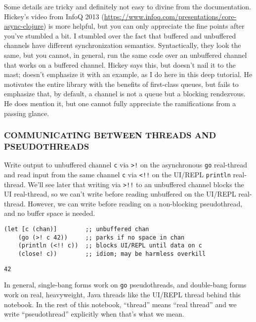 \documentclass[10pt,oneside,x11names]{article}
\begin{document}
Some details are tricky and definitely not easy to divine from the
documentation. Hickey's video from InfoQ 2013
(\url{https://www.infoq.com/presentations/core-async-clojure}) is more
helpful, but you can only appreciate the fine points after you've
stumbled a bit. I stumbled over the fact that buffered and unbuffered
channels have different synchronization semantics. Syntactically, they
look the same, but you cannot, in general, run the same code over an
unbuffered channel that works on a buffered channel. Hickey says this,
but doesn't nail it to the mast; doesn't emphasize it with an example,
as I do here in this deep tutorial. He motivates the entire library with
the benefits of first-class queues, but fails to emphasize that, by
default, a channel is not a queue but a blocking rendezvous. He does
mention it, but one cannot fully appreciate the ramifications from a
passing glance.

\subsubsection{COMMUNICATING BETWEEN THREADS AND PSEUDOTHREADS}
\label{communicating-between-threads-and-pseudothreads}
Write output to unbuffered channel \texttt{c} via \texttt{>!} on the asynchronous \texttt{go}
real-thread and read input from the same channel \texttt{c} via \texttt{<!!} on the
UI/REPL \texttt{println} real-thread. We'll see later that writing via \texttt{>!!} to
an unbuffered channel blocks the UI real-thread, so we can't write
before reading unbuffered on the UI/REPL real-thread. However, we can
write before reading on a non-blocking pseudothread, and no buffer space
is needed.

\begin{verbatim}
(let [c (chan)]        ;; unbuffered chan
    (go (>! c 42))     ;; parks if no space in chan
    (println (<!! c))  ;; blocks UI/REPL until data on c
    (close! c))        ;; idiom; may be harmless overkill
\end{verbatim}

\begin{verbatim}
42
\end{verbatim}


In general, single-bang forms work on \texttt{go} pseudothreads, and
double-bang forms work on real, heavyweight, Java threads like the
UI/REPL thread behind this notebook. In the rest of this notebook,
``thread'' means ``real thread'' and we write ``pseudothread'' explicitly when
that's what we mean.
\end{document}
